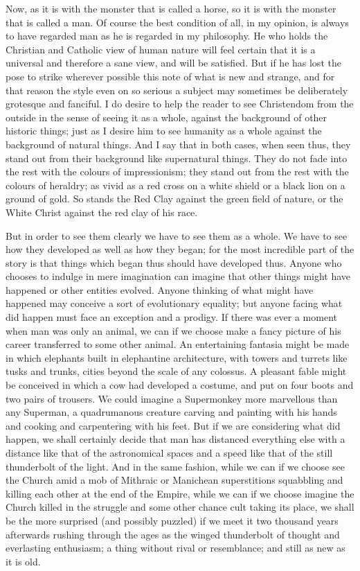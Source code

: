 Now, as it is with the monster that is called a horse, so it is with the monster that is called a man. Of course the best condition of all, in my opinion, is always to have regarded man as he is regarded in my philosophy. He who holds the Christian and Catholic view of human nature will feel certain that it is a universal and therefore a sane view, and will be satisfied. But if he has lost the pose to strike wherever possible this note of what is new and strange, and for that reason the style even on so serious a subject may sometimes be deliberately grotesque and fanciful. I do desire to help the reader to see Christendom from the outside in the sense of seeing it as a whole, against the background of other historic things; just as I desire him to see humanity as a whole against the background of natural things. And I say that in both cases, when seen thus, they stand out from their background like supernatural things. They do not fade into the rest with the colours of impressionism; they stand out from the rest with the colours of heraldry; as vivid as a red cross on a white shield or a black lion on a ground of gold. So stands the Red Clay against the green field of nature, or the White Christ against the red clay of his race.

But in order to see them clearly we have to see them as a whole. We have to see how they developed as well as how they began; for the most incredible part of the story is that things which began thus should have developed thus. Anyone who chooses to indulge in mere imagination can imagine that other things might have happened or other entities evolved. Anyone thinking of what might have happened may conceive a sort of evolutionary equality; but anyone facing what did happen must face an exception and a prodigy. If there was ever a moment when man was only an animal, we can if we choose make a fancy picture of his career transferred to some other animal. An entertaining fantasia might be made in which elephants built in elephantine architecture, with towers and turrets like tusks and trunks, cities beyond the scale of any colossus. A pleasant fable might be conceived in which a cow had developed a costume, and put on four boots and two pairs of trousers. We could imagine a Supermonkey more marvellous than any Superman, a quadrumanous creature carving and painting with his hands and cooking and carpentering with his feet. But if we are considering what did happen, we shall certainly decide that man has distanced everything else with a distance like that of the astronomical spaces and a speed like that of the still thunderbolt of the light. And in the same fashion, while we can if we choose see the Church amid a mob of Mithraic or Manichean superstitions squabbling and killing each other at the end of the Empire, while we can if we choose imagine the Church killed in the struggle and some other chance cult taking its place, we shall be the more surprised (and possibly puzzled) if we meet it two thousand years afterwards rushing through the ages as the winged thunderbolt of thought and everlasting enthusiasm; a thing without rival or resemblance; and still as new as it is old.

